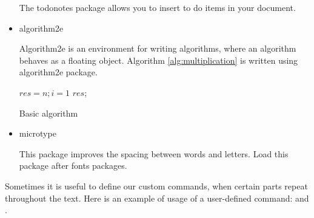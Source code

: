 \begin{itemize}
	The todonotes package allows you to insert to do items in your document.
	
	
	\item{algorithm2e}
	
	Algorithm2e is an environment for writing algorithms, where an algorithm behaves as a floating object. Algorithm \ref{alg:multiplication} is written using algorithm2e package.
	
	\begin{algorithm}[h]
		\label{alg:multiplication}
    $res = n; i=1$\;
		\Return $res$;
		\caption{Basic algorithm}
	\end{algorithm}
	
	\item{microtype}
	 
	This package improves the spacing between words and letters. Load this package after fonts packages.
	
\end{itemize}

Sometimes it is useful to define our custom commands, when certain parts repeat throughout the text. Here is an example of usage of a user-defined command:  and  .
